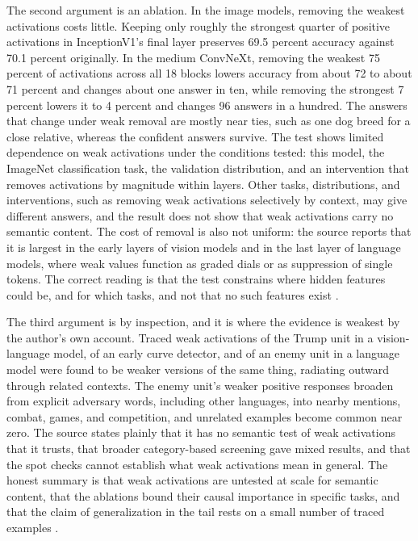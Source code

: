 \documentclass[11pt]{article}
\begin{document}
The second argument is an ablation. In the image models, removing the weakest activations costs little. Keeping only roughly the strongest quarter of positive activations in InceptionV1's final layer preserves 69.5 percent accuracy against 70.1 percent originally. In the medium ConvNeXt, removing the weakest 75 percent of activations across all 18 blocks lowers accuracy from about 72 to about 71 percent and changes about one answer in ten, while removing the strongest 7 percent lowers it to 4 percent and changes 96 answers in a hundred. The answers that change under weak removal are mostly near ties, such as one dog breed for a close relative, whereas the confident answers survive. The test shows limited dependence on weak activations under the conditions tested: this model, the ImageNet classification task, the validation distribution, and an intervention that removes activations by magnitude within layers. Other tasks, distributions, and interventions, such as removing weak activations selectively by context, may give different answers, and the result does not show that weak activations carry no semantic content. The cost of removal is also not uniform: the source reports that it is largest in the early layers of vision models and in the last layer of language models, where weak values function as graded dials or as suppression of single tokens. The correct reading is that the test constrains where hidden features could be, and for which tasks, and not that no such features exist \cite[\emph{Do Weak Activations Matter?; Weak Activations: Further Measurements}]{cammarata}.

The third argument is by inspection, and it is where the evidence is weakest by the author's own account. Traced weak activations of the Trump unit in a vision-language model, of an early curve detector, and of an enemy unit in a language model were found to be weaker versions of the same thing, radiating outward through related contexts. The enemy unit's weaker positive responses broaden from explicit adversary words, including other languages, into nearby mentions, combat, games, and competition, and unrelated examples become common near zero. The source states plainly that it has no semantic test of weak activations that it trusts, that broader category-based screening gave mixed results, and that the spot checks cannot establish what weak activations mean in general. The honest summary is that weak activations are untested at scale for semantic content, that the ablations bound their causal importance in specific tasks, and that the claim of generalization in the tail rests on a small number of traced examples \cite[\emph{Weak Activations: Further Measurements}]{cammarata}.
\end{document}
